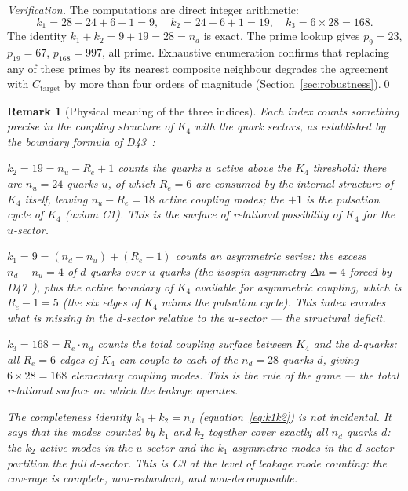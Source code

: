 \documentclass[12pt,a4paper]{article}
\newtheorem{remark}[theorem]{Remark}
\newcommand{\Kfour}{K_4}
\renewcommand{\Re}{R_e}
\newcommand{\Dn}{\Delta n}
\begin{document}
\begin{proof}[Verification]
The computations are direct integer arithmetic:
\[
k_1 = 28 - 24 + 6 - 1 = 9, \quad k_2 = 24 - 6 + 1 = 19, \quad k_3 = 6 \times 28 = 168.
\]
The identity $k_1 + k_2 = 9 + 19 = 28 = n_d$ is exact. The prime lookup gives $p_9 = 23$, $p_{19} = 67$, $p_{168} = 997$, all prime. Exhaustive enumeration confirms that replacing any of these primes by its nearest composite neighbour degrades the agreement with $C_{\mathrm{target}}$ by more than four orders of magnitude (Section~\ref{sec:robustness}).\qed
\end{proof}

\begin{remark}[Physical meaning of the three indices]
Each index counts something precise in the coupling structure of $\Kfour$ with the quark sectors, as established by the boundary formula of D43~\cite{PDL_D43_2026}:

$k_2 = 19 = n_u - \Re + 1$ counts the quarks $u$ \emph{active above the $\Kfour$ threshold}: there are $n_u = 24$ quarks $u$, of which $\Re = 6$ are consumed by the internal structure of $\Kfour$ itself, leaving $n_u - \Re = 18$ active coupling modes; the $+1$ is the pulsation cycle of $\Kfour$ (axiom C1). This is the \emph{surface of relational possibility} of $\Kfour$ for the $u$-sector.

$k_1 = 9 = (n_d - n_u) + (\Re - 1)$ counts an \emph{asymmetric series}: the excess $n_d - n_u = 4$ of $d$-quarks over $u$-quarks (the isospin asymmetry $\Dn = 4$ forced by D47~\cite{PDL_D47_2026}), plus the \emph{active boundary} of $\Kfour$ available for asymmetric coupling, which is $\Re - 1 = 5$ (the six edges of $\Kfour$ minus the pulsation cycle). This index encodes \emph{what is missing} in the $d$-sector relative to the $u$-sector — the structural deficit.

$k_3 = 168 = \Re \cdot n_d$ counts the \emph{total coupling surface} between $\Kfour$ and the $d$-quarks: all $\Re = 6$ edges of $\Kfour$ can couple to each of the $n_d = 28$ quarks $d$, giving $6 \times 28 = 168$ elementary coupling modes. This is the \emph{rule of the game} — the total relational surface on which the leakage operates.

The completeness identity $k_1 + k_2 = n_d$ (equation~\eqref{eq:k1k2}) is not incidental. It says that the modes counted by $k_1$ and $k_2$ together cover exactly all $n_d$ quarks $d$: the $k_2$ active modes in the $u$-sector and the $k_1$ asymmetric modes in the $d$-sector partition the full $d$-sector. This is C3 at the level of leakage mode counting: the coverage is complete, non-redundant, and non-decomposable.
\end{remark}
\end{document}
